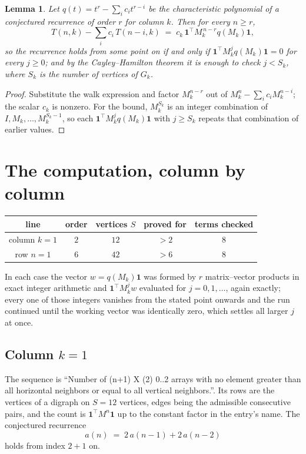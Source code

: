 \documentclass[11pt,a4paper]{article}
\theoremstyle{plain}
\newtheorem{lemma}[theorem]{Lemma}
\theoremstyle{definition}
\begin{document}
\begin{lemma}\label{lem:crit}
Let $q(t)=t^{r}-\sum_i c_it^{r-i}$ be the characteristic polynomial of a conjectured
recurrence of order $r$ for column $k$. Then for every $n\ge r$,
\[
T(n,k)-\sum_i c_i\,T(n-i,k)\;=\;c_k\,\mathbf{1}^{\!\top}M_k^{\,n-r}q(M_k)\mathbf{1},
\]
so the recurrence holds from some point on if and only if
$\mathbf{1}^{\!\top}M_k^{j}q(M_k)\mathbf{1}=0$ for every $j\ge0$; and by the
Cayley--Hamilton theorem it is enough to check $j<S_k$, where $S_k$ is the number of vertices
of $G_k$.
\end{lemma}

\begin{proof}
Substitute the walk expression and factor $M_k^{n-r}$ out of $M_k^{n}-\sum_ic_iM_k^{n-i}$;
the scalar $c_k$ is nonzero. For the bound, $M_k^{S_k}$ is an integer combination of
$I,M_k,\dots,M_k^{S_k-1}$, so each $\mathbf{1}^{\!\top}M_k^{j}q(M_k)\mathbf{1}$ with
$j\ge S_k$ repeats that combination of earlier values.
\end{proof}

\section{The computation, column by column}

\begin{center}
\begin{tabular}{ccccc}
line & order & vertices $S$ & proved for & terms checked \\ \hline
column $k$$=1$ & $2$ & $12$ & $>2$ & $8$ \\
row $n$$=1$ & $6$ & $42$ & $>6$ & $8$ \\
\end{tabular}
\end{center}

In each case the vector $w=q(M_k)\mathbf{1}$ was formed by $r$ matrix--vector products in
exact integer arithmetic and $\mathbf{1}^{\!\top}M_k^{j}w$ evaluated for $j=0,1,\dots$,
again exactly; every one of those integers vanishes from the stated point onwards and the run
continued until the working vector was identically zero, which settles all larger $j$ at once.

\subsection*{Column $k$$=1$}
The sequence is ``Number of (n+1) X (2) 0..2 arrays with no element greater than all horizontal neighbors or equal to all vertical neighbors.''. Its rows are the vertices of a digraph on
$S=12$ vertices, edges being the admissible consecutive pairs, and the count is
$\mathbf{1}^{\!\top}M^{n}\mathbf{1}$ up to the constant factor in the entry's name.
The conjectured recurrence
\[
a(n)\;=\;2\,a(n-1) + 2\,a(n-2)
\]
holds from index $2+1$ on.
\end{document}

